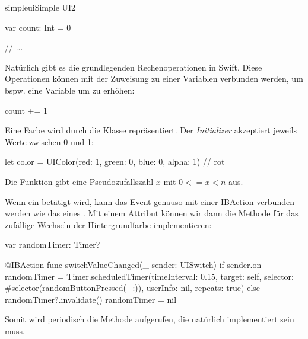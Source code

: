 \documentclass[parskip=half, final]{scrreprt}
\begin{document}
\begin{lecture}
\begin{exc}
\begin{excitem}{simpleui}{Simple UI}{2}
\begin{exchinweise}
\begin{swiftcode}
{    var count: Int = 0
    
    // ...
}
\end{swiftcode}
\item Natürlich gibt es die grundlegenden Rechenoperationen \swiftinline{+-*/} in Swift. Diese Operationen können mit der Zuweisung zu einer Variablen verbunden werden, um bspw. eine Variable  um  zu erhöhen:
\begin{swiftcode}
count += 1
\end{swiftcode}
\item Eine Farbe wird durch die Klasse  repräsentiert. Der \emph{Initializer}  akzeptiert jeweils Werte zwischen 0 und 1:
\begin{swiftcode}
let color = UIColor(red: 1, green: 0, blue: 0, alpha: 1) // rot
\end{swiftcode}
\item Die Funktion  gibt eine Pseudozufallszahl $x$ mit $0<=x<n$ aus.
\item Wenn ein  betätigt wird, kann das Event genauso mit einer IBAction verbunden werden wie das eines . Mit einem Attribut  können wir dann die Methode für das zufällige Wechseln der Hintergrundfarbe implementieren:
\begin{swiftcode}
var randomTimer: Timer?

@IBAction func switchValueChanged(_ sender: UISwitch) {
    if sender.on {
        randomTimer = Timer.scheduledTimer(timeInterval: 0.15, target: self, selector: #selector(randomButtonPressed(_:)), userInfo: nil, repeats: true)
    } else {
        randomTimer?.invalidate()
        randomTimer = nil
    }
}
\end{swiftcode}
	Somit wird periodisch die Methode  aufgerufen, die natürlich implementiert sein muss.

\end{exchinweise}

\end{excitem}

\end{exc}


\end{lecture}
\end{document}
